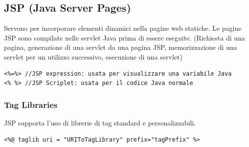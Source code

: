 \subsection{JSP (Java Server Pages)}
Servono per incorporare elementi dinamici nella pagine web statiche.
Le pagine JSP sono compilate nelle servlet Java prima di essere eseguite.
(Richiesta di una pagina, generazione di una servlet da una pagina JSP, memorizzazione di una servlet per un utilizzo successivo, esecuzione di una servlet)

\begin{lstlisting}
<%=%> //JSP expression: usata per visualizzare una variabile Java
<% %> //JSP Scriplet: usata per il codice Java normale 
\end{lstlisting}

\subsubsection{Tag Libraries}
JSP supporta l’uso di librerie di tag standard e personalizzabili.
\begin{lstlisting}
<%@ taglib uri = "URIToTagLibrary" prefix="tagPrefix" %>
\end{lstlisting}

